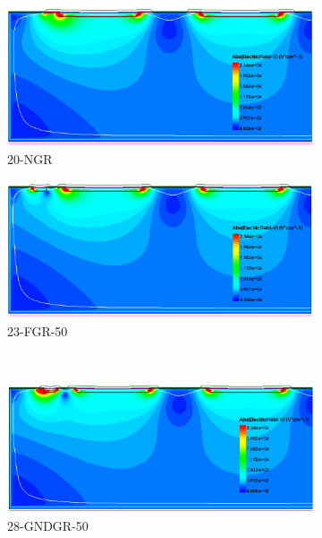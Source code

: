 \begin{figure}[htbp]
  \centering
  \begin{subfigure}[b]{0.5\textwidth}
    \includegraphics[width=\textwidth]{figures/ActiveEdge/Efield_20_NGR.png}
    \caption{20-NGR}
  \end{subfigure}\hfill
  \begin{subfigure}[b]{0.5\textwidth}
    \includegraphics[width=\textwidth]{figures/ActiveEdge/Efield_23_FGR.png}
    \caption{23-FGR-50}
  \end{subfigure} \\
  \begin{subfigure}[b]{0.5\textwidth}
    \includegraphics[width=\textwidth]{figures/ActiveEdge/Efield_28_GNDGR.png}
    \caption{28-GNDGR-50}
  \end{subfigure}\hfill
  \begin{subfigure}[b]{0.5\textwidth}

\end{subfigure}
\end{figure}
